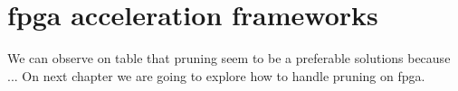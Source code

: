 \section{\acrshort{fpga} acceleration frameworks} \label{sec:cclopti}
We can observe on table that pruning seem to be a preferable solutions because ... \newline \newline
On next chapter we are going to explore how to handle pruning on \acrshort{fpga}.
